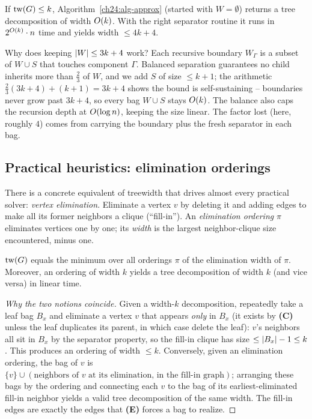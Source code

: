 \begin{theorem}
\label{ch24:thm-approx}
If $\operatorname{tw}(G)\le k$, Algorithm~\ref{ch24:alg-approx} (started with $W=\emptyset$)
returns a tree decomposition of width $O(k)$. With the right separator routine
it runs in $2^{O(k)}\cdot n$ time and yields width $\le 4k+4$.
\end{theorem}

\begin{whybox}
Why does keeping $\lvert W\rvert\le 3k+4$ work? Each recursive boundary $W_\Gamma$ is a
subset of $W\cup S$ that touches component $\Gamma$. Balanced separation
guarantees no child inherits more than $\tfrac{2}{3}$ of $W$, and we add $S$ of
size $\le k+1$; the arithmetic $\tfrac{2}{3}(3k+4)+(k+1)=3k+4$ shows the bound is
self-sustaining -- boundaries never grow past $3k+4$, so every bag $W\cup S$ stays
$O(k)$. The balance also caps the recursion depth at $O(\log n)$, keeping the
size linear. The factor lost (here, roughly $4$) comes from carrying the boundary
plus the fresh separator in each bag.
\end{whybox}

\subsection{Practical heuristics: elimination orderings}

There is a concrete equivalent of treewidth that drives almost every practical
solver: \emph{vertex elimination}. Eliminate a vertex $v$ by deleting it and
adding edges to make all its former neighbors a clique (``fill-in''). An
\emph{elimination ordering} $\pi$ eliminates vertices one by one; its \emph{width}
is the largest neighbor-clique size encountered, minus one.

\begin{theorem}
\label{ch24:thm-elim}
$\operatorname{tw}(G)$ equals the minimum over all orderings $\pi$ of the elimination width
of $\pi$. Moreover, an ordering of width $k$ yields a tree decomposition of width
$k$ (and vice versa) in linear time.
\end{theorem}

\begin{proof}[Why the two notions coincide]
Given a width-$k$ decomposition, repeatedly take a leaf bag $B_x$ and eliminate a
vertex $v$ that appears \emph{only} in $B_x$ (it exists by \textbf{(C)} unless the
leaf duplicates its parent, in which case delete the leaf): $v$'s neighbors all
sit in $B_x$ by the separator property, so the fill-in clique has size
$\le\lvert B_x\rvert-1\le k$. This produces an ordering of width $\le k$. Conversely,
given an elimination ordering, the bag of $v$ is $\{v\}\cup(\text{neighbors of }v
\text{ at its elimination, in the fill-in graph})$; arranging these bags by the
ordering and connecting each $v$ to the bag of its earliest-eliminated fill-in
neighbor yields a valid tree decomposition of the same width. The fill-in edges
are exactly the edges that \textbf{(E)} forces a bag to realize.
\end{proof}

